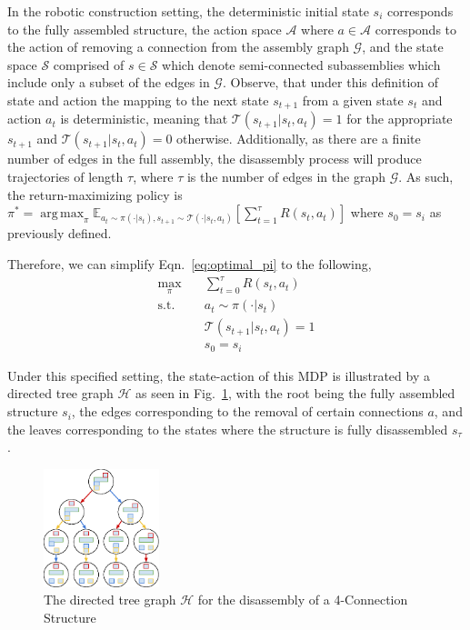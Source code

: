 \documentclass{article}
\DeclareMathOperator*{\argmax}{arg\,max}
\begin{document}
In the robotic construction setting, the deterministic initial state $s_i$ corresponds to the fully assembled structure, the action space $\mathcal{A}$ where $a \in \mathcal{A}$ corresponds to the action of removing a connection from the assembly graph $\mathcal{G}$, and the state space $\mathcal{S}$ comprised of $s \in \mathcal{S}$ which denote semi-connected subassemblies which include only a subset of the edges in $\mathcal{G}$. Observe, that under this definition of state and action the mapping to the next state $s_{t+1}$ from a given state $s_t$ and action $a_t$ is deterministic, meaning that $\mathcal{T}(s_{t+1} | s_t, a_t) = 1$ for the appropriate $s_{t+1}$ and $\mathcal{T}(s_{t+1} | s_t, a_t) = 0$ otherwise. Additionally, as there are a finite number of edges in the full assembly, the disassembly process will produce trajectories of length $\tau$, where $\tau$ is the number of edges in the graph $\mathcal{G}$. As such, the return-maximizing policy is $\pi^*=\argmax_\pi \mathbb{E}_{a_t\sim\pi(\cdot|s_t), s_{t+1}\sim\mathcal{T}(\cdot | s_t, a_t)}[\sum_{t=1}^{\tau}R(s_t, a_t)]$ where $s_0 = s_i$ as previously defined. 

Therefore, we can simplify Eqn.~\ref{eq:optimal_pi} to the following,
\begin{equation} \label{eq:optimization}
    \begin{aligned}
        \max_{\pi} \quad & \sum_{t=0}^{\tau}{R(s_t,a_t)}\\
        \textrm{s.t.} \quad & a_t \sim \pi(\cdot|s_t) \\
        & \mathcal{T}(s_{t+1}|s_t,a_t) = 1\\
        & s_0 = s_i
    \end{aligned}
\end{equation}

Under this specified setting, the state-action of this MDP is illustrated by a directed tree graph $\mathcal{H}$ as seen in Fig.~\ref{fig: treeGen}, with the root being the fully assembled structure $s_i$, the edges corresponding to the removal of certain connections $a$, and the leaves corresponding to the states where the structure is fully disassembled $s_\tau$.

\begin{figure}[h!]
\centering
\includegraphics[width=0.3\textwidth]{figs/SubassemblyTreeGeneration.eps}
  \caption{The directed tree graph $\mathcal{H}$ for the disassembly of a 4-Connection Structure}
  \label{fig: treeGen}
\end{figure}
\end{document}
